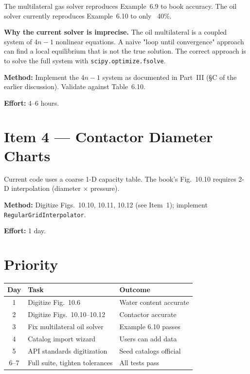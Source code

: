 \documentclass[11pt,a4paper,openany]{book}
\newcommand{\code}[1]{\texttt{#1}}
\begin{document}
\begin{purpose}
The multilateral gas solver reproduces Example~6.9 to book accuracy.
The oil solver currently reproduces Example~6.10 to only ~40\%.
\end{purpose}

\begin{theory}
\textbf{Why the current solver is imprecise.} The oil multilateral
is a coupled system of $4n-1$ nonlinear equations. A naive
"loop until convergence" approach can find a local equilibrium that
is not the true solution. The correct approach is to solve the full
system with \code{scipy.optimize.fsolve}.
\end{theory}

\textbf{Method:} Implement the $4n-1$ system as documented in Part~III
(§C of the earlier discussion). Validate against Table~6.10.

\textbf{Effort:} 4--6 hours.

\section{Item 4 — Contactor Diameter Charts}

\begin{purpose}
Current code uses a coarse 1-D capacity table. The book's Fig.~10.10
requires 2-D interpolation (diameter × pressure).
\end{purpose}

\textbf{Method:} Digitize Figs.~10.10, 10.11, 10.12 (see Item~1);
implement \code{RegularGridInterpolator}.

\textbf{Effort:} 1 day.

\section{Priority}

\begin{center}
\begin{tabular}{@{}cll@{}}
\toprule
Day & Task & Outcome \\
\midrule
1 & Digitize Fig.~10.6 & Water content accurate \\
2 & Digitize Figs.~10.10--10.12 & Contactor accurate \\
3 & Fix multilateral oil solver & Example 6.10 passes \\
4 & Catalog import wizard & Users can add data \\
5 & API standards digitization & Seed catalogs official \\
6--7 & Full suite, tighten tolerances & All tests pass \\
\bottomrule
\end{tabular}
\end{center}
\end{document}

